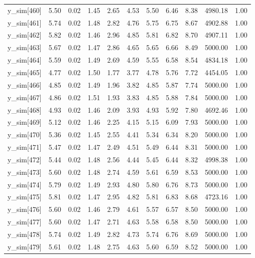 \begin{table}[ht]
\begin{tabular}{rrrrrrrrrrr}
  y\_sim[460] & 5.50 & 0.02 & 1.45 & 2.65 & 4.53 & 5.50 & 6.46 & 8.38 & 4980.18 & 1.00 \\ 
  y\_sim[461] & 5.74 & 0.02 & 1.48 & 2.82 & 4.76 & 5.75 & 6.75 & 8.67 & 4902.88 & 1.00 \\ 
  y\_sim[462] & 5.82 & 0.02 & 1.46 & 2.96 & 4.85 & 5.81 & 6.82 & 8.70 & 4907.11 & 1.00 \\ 
  y\_sim[463] & 5.67 & 0.02 & 1.47 & 2.86 & 4.65 & 5.65 & 6.66 & 8.49 & 5000.00 & 1.00 \\ 
  y\_sim[464] & 5.59 & 0.02 & 1.49 & 2.69 & 4.59 & 5.55 & 6.58 & 8.54 & 4834.18 & 1.00 \\ 
  y\_sim[465] & 4.77 & 0.02 & 1.50 & 1.77 & 3.77 & 4.78 & 5.76 & 7.72 & 4454.05 & 1.00 \\ 
  y\_sim[466] & 4.85 & 0.02 & 1.49 & 1.96 & 3.82 & 4.85 & 5.87 & 7.74 & 5000.00 & 1.00 \\ 
  y\_sim[467] & 4.86 & 0.02 & 1.51 & 1.93 & 3.83 & 4.85 & 5.88 & 7.84 & 5000.00 & 1.00 \\ 
  y\_sim[468] & 4.93 & 0.02 & 1.46 & 2.09 & 3.93 & 4.93 & 5.92 & 7.80 & 4692.46 & 1.00 \\ 
  y\_sim[469] & 5.12 & 0.02 & 1.46 & 2.25 & 4.15 & 5.15 & 6.09 & 7.93 & 5000.00 & 1.00 \\ 
  y\_sim[470] & 5.36 & 0.02 & 1.45 & 2.55 & 4.41 & 5.34 & 6.34 & 8.20 & 5000.00 & 1.00 \\ 
  y\_sim[471] & 5.47 & 0.02 & 1.47 & 2.49 & 4.51 & 5.49 & 6.44 & 8.31 & 5000.00 & 1.00 \\ 
  y\_sim[472] & 5.44 & 0.02 & 1.48 & 2.56 & 4.44 & 5.45 & 6.44 & 8.32 & 4998.38 & 1.00 \\ 
  y\_sim[473] & 5.60 & 0.02 & 1.48 & 2.74 & 4.59 & 5.61 & 6.59 & 8.53 & 5000.00 & 1.00 \\ 
  y\_sim[474] & 5.79 & 0.02 & 1.49 & 2.93 & 4.80 & 5.80 & 6.76 & 8.73 & 5000.00 & 1.00 \\ 
  y\_sim[475] & 5.81 & 0.02 & 1.47 & 2.95 & 4.82 & 5.81 & 6.83 & 8.68 & 4723.16 & 1.00 \\ 
  y\_sim[476] & 5.60 & 0.02 & 1.46 & 2.79 & 4.61 & 5.57 & 6.57 & 8.50 & 5000.00 & 1.00 \\ 
  y\_sim[477] & 5.60 & 0.02 & 1.47 & 2.71 & 4.63 & 5.58 & 6.58 & 8.50 & 5000.00 & 1.00 \\ 
  y\_sim[478] & 5.74 & 0.02 & 1.49 & 2.82 & 4.73 & 5.74 & 6.76 & 8.69 & 5000.00 & 1.00 \\ 
  y\_sim[479] & 5.61 & 0.02 & 1.48 & 2.75 & 4.63 & 5.60 & 6.59 & 8.52 & 5000.00 & 1.00 \\ 

\end{tabular}
\end{table}
